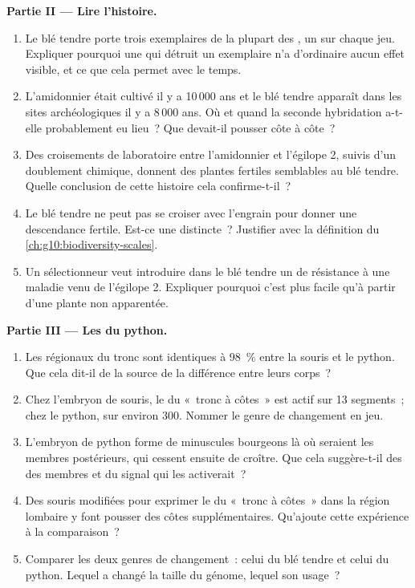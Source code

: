 \begin{problem}
\medskip
\noindent\textbf{Partie II --- Lire l'histoire.}
\begin{enumerate}[resume]
  \item Le blé tendre porte trois exemplaires de la plupart des ,
        un sur chaque jeu. Expliquer pourquoi une  qui détruit
        un exemplaire n'a d'ordinaire aucun effet visible, et ce que
        cela permet avec le temps.
  \item L'amidonnier était cultivé il y a 10\,000 ans et le blé tendre
        apparaît dans les sites archéologiques il y a 8\,000 ans. Où et
        quand la seconde hybridation a-t-elle probablement eu lieu~?
        Que devait-il pousser côte à côte~?
  \item Des croisements de laboratoire entre l'amidonnier et l'égilope
        2, suivis d'un doublement chimique, donnent des plantes
        fertiles semblables au blé tendre. Quelle conclusion de cette
        histoire cela confirme-t-il~?
  \item Le blé tendre ne peut pas se croiser avec l'engrain pour donner
        une descendance fertile. Est-ce une  distincte~? Justifier
        avec la définition du \cref{ch:g10:biodiversity-scales}.
  \item Un sélectionneur veut introduire dans le blé tendre un  de
        résistance à une maladie venu de l'égilope 2. Expliquer
        pourquoi c'est plus facile qu'à partir d'une plante non
        apparentée.
\end{enumerate}

\medskip
\noindent\textbf{Partie III --- Les  du python.}
\begin{enumerate}[resume]
  \item Les  régionaux du tronc sont identiques à 98~\% entre la
        souris et le python. Que cela dit-il de la source de la
        différence entre leurs corps~?
  \item Chez l'embryon de souris, le  du «~tronc à côtes~» est
        actif sur 13 segments~; chez le python, sur environ 300. Nommer
        le genre de changement en jeu.
  \item L'embryon de python forme de minuscules bourgeons là où
        seraient les membres postérieurs, qui cessent ensuite de
        croître. Que cela suggère-t-il des  des membres et du
        signal qui les activerait~?
  \item Des souris modifiées pour exprimer le  du «~tronc à côtes~»
        dans la région lombaire y font pousser des côtes
        supplémentaires. Qu'ajoute cette expérience à la comparaison~?
  \item Comparer les deux genres de changement~: celui du blé tendre et
        celui du python. Lequel a changé la taille du génome, lequel son
        usage~?
\end{enumerate}


\end{problem}
